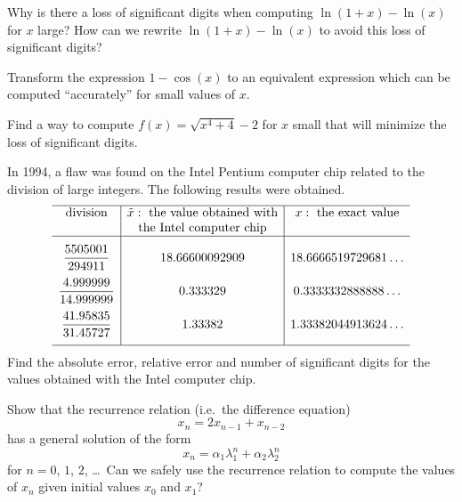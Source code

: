 \begin{question}
Why is there a loss of significant digits when computing
$\ln(1+x) - \ln(x)$ for $x$ large?  How can we rewrite
$\ln(1+x) - \ln(x)$ to avoid this loss of significant digits?
\label{arithQ9}
\end{question}

\begin{question}
Transform the expression $1-\cos(x)$ to an equivalent expression which
can be computed ``accurately'' for small values of $x$.
\label{arithQ10}
\end{question}

\begin{question}
Find a way to compute $f(x) = \sqrt{x^4+4}-2$ for $x$ small that will
minimize the loss of significant digits.
\label{arithQ11}
\end{question}

\begin{question}
In 1994, a flaw was found on the Intel Pentium computer chip related
to the division of large integers.  The following results were
obtained.
\[
\begin{array}{c|c|c}
\hline
\text{division} & \tilde{x} : \text{ the value obtained with} &
x : \text{ the exact value} \\
& \text{the Intel computer chip} & \\
\hline
\rule[1em]{0em}{1em}
\displaystyle \frac{5505001}{294911} & 18.66600092909 &
18.6666519729681\ldots \\[1em]
\displaystyle \frac{4.999999}{14.999999} & 0.333329 & 0.3333332888888\ldots
\\[1em]
\displaystyle \frac{41.95835}{31.45727} & 1.33382 &
1.33382044913624\ldots \\[1em]
\hline
\end{array}
\]
Find the absolute error, relative error and number of significant
digits for the values obtained with the Intel computer chip.
\label{arithQ12}
\end{question}

\begin{question}
Show that the recurrence relation (i.e.\ the difference equation)
\begin{equation}\label{finite_diff}
x_n = 2 x_{n-1} + x_{n-2}
\end{equation}
has a general solution of the form
\[
x_n = \alpha_1 \lambda_1^n + \alpha_2 \lambda_2^n
\]
for $n=0$, $1$, $2$, \ldots\  Can we safely use the recurrence relation
to compute the values of $x_n$ given initial values $x_0$ and $x_1$?
\label{arithQ13}
\end{question}

